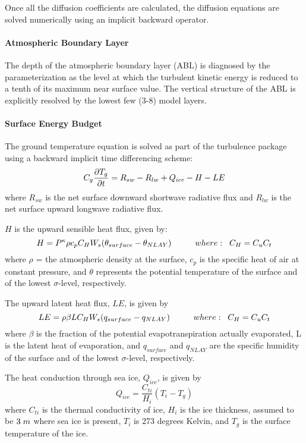 Once all the diffusion coefficients are calculated, the diffusion equations are solved numerically
using an implicit backward operator.

\paragraph{Atmospheric Boundary Layer}

The depth of the atmospheric boundary layer (ABL) is diagnosed by the parameterization as the
level at which the turbulent kinetic energy is reduced to a tenth of its maximum near surface value.
The vertical structure of the ABL is explicitly resolved by the lowest few (3-8) model layers.

\paragraph{Surface Energy Budget}

The ground temperature equation is solved as part of the turbulence package
using a backward implicit time differencing scheme:
\[
C_g\frac{\partial T_g}{\partial t} = R_{sw} - R_{lw} + Q_{ice} - H - LE
\]
where $R_{sw}$ is the net surface downward shortwave radiative flux and $R_{lw}$ is the
net surface upward longwave radiative flux. 

$H$ is the upward sensible heat flux, given by:
\[
{H} =  P^{\kappa}\rho c_{p} C_{H} W_s (\theta_{surface} - \theta_{NLAY})
\hspace{1cm}where: \hspace{.2cm}C_H = C_u C_t
\]
where $\rho$ = the atmospheric density at the surface, $c_{p}$ is the specific
heat of air at constant pressure, and $\theta$ represents the potential temperature
of the surface and of the lowest $\sigma$-level, respectively.
 
The upward latent heat flux, $LE$, is given by
\[
{LE} =  \rho \beta L C_{H} W_s (q_{surface} - q_{NLAY})
\hspace{1cm}where: \hspace{.2cm}C_H = C_u C_t
\]
where $\beta$ is the fraction of the potential evapotranspiration actually evaporated,
L is the latent heat of evaporation, and $q_{surface}$ and $q_{NLAY}$ are the specific
humidity of the surface and of the lowest $\sigma$-level, respectively.

The heat conduction through sea ice, $Q_{ice}$, is given by
\[
{Q_{ice}} = \frac{C_{ti} }{ H_i} (T_i-T_g)
\]
where $C_{ti}$ is the thermal conductivity of ice, $H_i$ is the ice thickness, assumed to
be $3 \hspace{.1cm} m$ where sea ice is present, $T_i$ is 273 degrees Kelvin, and $T_g$ is the 
surface temperature of the ice.

